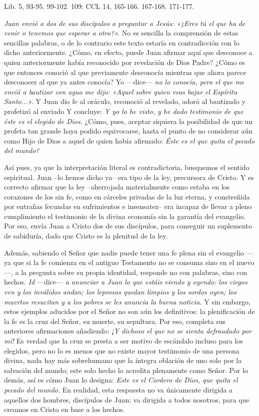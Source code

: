 \documentclass[]{article}
\begin{document}
Lib. 5, 93-95. 99-102. 109: CCL 14, 165-166. 167-168. 171-177.

\emph{Juan envió a dos de sus discípulos a preguntar a Jesús: «¿Eres tú
el que ha de venir o tenemos que esperar a otro?».} No es sencilla la
comprensión de estas sencillas palabras, o de lo contrario este texto
estaría en contradicción con lo dicho anteriormente. ¿Cómo, en efecto,
puede Juan afirmar aquí que desconoce a quien anteriormente había
reconocido por revelación de Dios Padre? ¿Cómo es que entonces conoció
al que previamente desconocía mientras que ahora parece desconocer al
que ya antes conocía? Yo ---dice--- \emph{no lo conocía, pero el que me
envió a bautizar con agua me dijo: «Aquel sobre quien veas bajar el
Espíritu Santo...».} Y Juan dio fe al oráculo, reconoció al revelado,
adoró al bautizado y profetizó al enviado Y concluye: \emph{Y yo lo he
visto, y he dado testimonio de que éste es el elegido de Dios.} ¿Cómo,
pues, aceptar siquiera la posibilidad de que un profeta tan grande haya
podido equivocarse, hasta el punto de no considerar aún como Hijo de
Dios a aquel de quien había afirmado: \emph{Éste es el que quita el
pecado del mundo?}

Así pues, ya que la interpretación literal es contradictoria, busquemos
el sentido espiritual. Juan --lo hemos dicho ya-- era tipo de la ley,
precursora de Cristo. Y es correcto afirmar que la ley --aherrojada
materialmente como estaba en los corazones de los sin fe, como en
cárceles privadas de la luz eterna, y constreñida por entrañas fecundas
en sufrimientos e insensatez-- era incapaz de llevar a pleno
cumplimiento el testimonio de la divina economía sin la garantía del
evangelio. Por eso, envía Juan a Cristo dos de sus discípulos, para
conseguir un suplemento de sabiduría, dado que Cristo es la plenitud de
la ley.

Además, sabiendo el Señor que nadie puede tener una fe plena sin el
evangelio ---ya que si la fe comienza en el antiguo Testamento no se
consuma sino en el nuevo---, a la pregunta sobre su propia identidad,
responde no con palabras, sino con hechos. \emph{Id} ---dice--- \emph{a
anunciar a Juan lo que estáis viendo y oyendo: los ciegos ven y los
inválidos andan; los leprosos quedan limpios y los sordos oyen; los
muertos resucitan y a los pobres se les anuncia la buena noticia.} Y sin
embargo, estos ejemplos aducidos por el Señor no son aún los
definitivos: la plenificación de la fe es la cruz del Señor, su muerte,
su sepultura. Por eso, completa sus anteriores afirmaciones añadiendo:
\emph{¡Y dichoso el que no se sienta defraudado por mí!} Es verdad que
la cruz se presta a ser motivo de escándalo incluso para los elegidos,
pero no lo es menos que no existe mayor testimonio de una persona
divina, nada hay más sobrehumano que la íntegra oblación de uno solo por
la salvación del mundo; este solo hecho lo acredita plenamente como
Señor. Por lo demás, así es cómo Juan lo designa: \emph{Este es el
Cordero de Dios, que quita el pecado del mundo.} En realidad, esta
respuesta no va únicamente dirigida a aquellos dos hombres, discípulos
de Juan: va dirigida a todos nosotros, para que creamos en Cristo en
base a los hechos.
\end{document}
